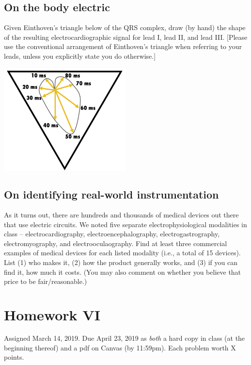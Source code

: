 \documentclass[11pt]{book}
\begin{document}
\section{On the body electric}

Given Einthoven's triangle below of the QRS complex, draw (by hand) the shape of the resulting electrocardiographic signal for lead I, lead II, and lead III. [Please use the conventional arrangement of Einthoven’s triangle when referring to your leads, unless you explicitly state you do otherwise.]

\begin{center}	\includegraphics[width=0.5\textwidth]{figures/hw5.02.png}
\end{center}

\section{On identifying real-world instrumentation}
As it turns out, there are hundreds and thousands of medical devices out there that use electric circuits. We noted five separate electrophysiological modalities in class – electrocardiography, electroencephalography, electrogastrography, electromyography, and electrooculaography. Find at least three commercial examples of medical devices for each listed modality (i.e., a total of 15 devices). List (1) who makes it, (2) how the product generally works, and (3) if you can find it, how much it costs. (You may also comment on whether you believe that price to be fair/reasonable.) 


\chapter*{Homework VI}
Assigned March 14, 2019. Due April 23, 2019 as \textit{both} a hard copy in class (at the beginning thereof) and a pdf on Canvas (by 11:59pm). Each problem worth X points.
\setcounter{chapter}{6}
\setcounter{section}{0}
\end{document}
